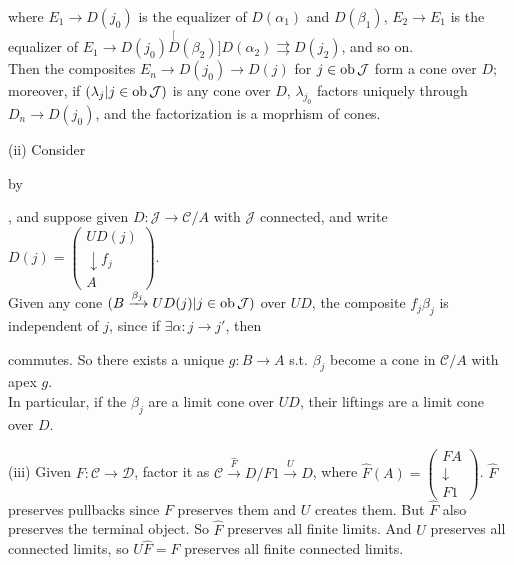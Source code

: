 \documentclass[a4paper]{article}
\begin{document}

where $E_1 \to D(j_0)$ is the equalizer of $D(\alpha_1)$ and $D(\beta_1)$, $E_2 \to E_1$ is the equalizer of $E_1 \to D(j_0) \stackrel[D(\beta_2)]{D(\alpha_2)}{\rightrightarrows} D(j_2)$, and so on.\\
Then the composites $E_n \to D(j_0) \to D(j)$ for $j \in \operatorname{ob}\mathcal{J}$ form a cone over $D$; moreover, if $(\lambda_j| j \in \operatorname{ob}\mathcal{J})$ is any cone over $D$, $\lambda_{j_0}$ factors uniquely through $D_n \to D(j_0)$, and the factorization is a moprhism of cones.

(ii) Consider 
by
, and suppose given $D:\mathcal{J} \to \mathcal{C}/A$ with $\mathcal{J}$ connected, and write $D(j) = \begin{pmatrix}UD(j)\\\downarrow f_j\\A \end{pmatrix}$.\\
Given any cone $(B\xrightarrow{\beta_j} UD(j) | j \in \operatorname{ob}\mathcal{J})$ over $UD$, the composite $f_j \beta_j$ is independent of $j$, since if $\exists \alpha:j \to j'$, then 

commutes. So there exists a unique $g:B \to A$ s.t. $\beta_j$ become a cone in $\mathcal{C}/A$ with apex $g$.\\
In particular, if the $\beta_j$ are a limit cone over $UD$, their liftings are a limit cone over $D$.

(iii) Given $F:\mathcal{C} \to \mathcal{D}$, factor it as $\mathcal{C} \xrightarrow{\hat{F}} D / F1 \xrightarrow{U} D$, where $\hat{F}(A) = \begin{pmatrix} FA\\\downarrow\\F1\end{pmatrix}$. $\hat{F}$ preserves pullbacks since $F$ preserves them and $U$ creates them. But $\hat{F}$ also preserves the terminal object. So $\hat{F}$ preserves all finite limits. And $U$ preserves all connected limits, so $U\hat{F} = F$ preserves all finite connected limits.
\end{document}
